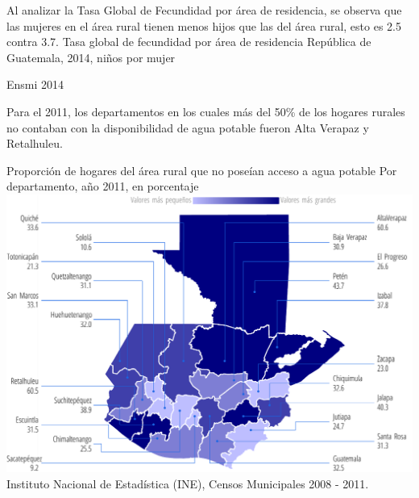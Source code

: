 
%
{%
	Al analizar la Tasa Global de Fecundidad por área de residencia, se observa que las mujeres en el área rural tienen menos hijos que las del área rural, esto es 2.5 contra 3.7. 
}%
{%
	Tasa global de fecundidad por área de residencia} %
{%
	República de Guatemala, 2014, niños por mujer} %
{%
	\begin{tikzpicture}[x=1pt,y=1pt]    \end{tikzpicture}}%
{%
	Ensmi 2014} %





%
{%
	
	Para el 2011, los departamentos en los cuales más del 50\% de los hogares rurales no contaban con la disponibilidad de agua potable fueron Alta Verapaz y Retalhuleu.}%
{%
	Proporción de hogares del área rural que no poseían acceso a agua potable
} %
{%
	Por departamento, año 2011, en porcentaje} %
{%
	\includegraphics[width=52\cuadri]{graficas/1_14.pdf}}%
{%
	Instituto Nacional de Estadística (INE), Censos Municipales 2008 - 2011.} %





